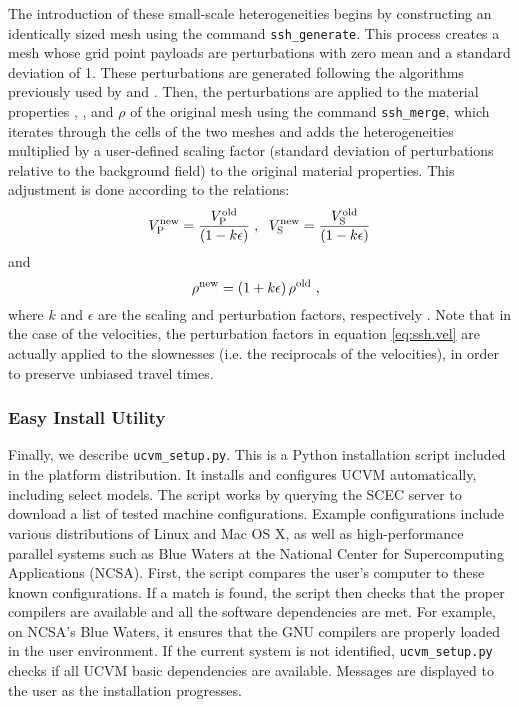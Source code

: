 The introduction of these small-scale heterogeneities begins by constructing an identically sized mesh using the command \texttt{ssh\_generate}. This process creates a mesh whose grid point payloads are perturbations with zero mean and a standard deviation of 1. These perturbations are generated following the algorithms previously used by \citet{Withers_2013_SCEC} and \citet{Savran_2014_SSA}. Then, the perturbations are applied to the material properties \vp{}, \vs{}, and $\rho$ of the original mesh using the command \texttt{ssh\_merge}, which iterates through the cells of the two meshes and adds the heterogeneities multiplied by a user-defined scaling factor (standard deviation of perturbations relative to the background field) to the original material properties. This adjustment is done according to the relations:
\begin{equation}
\label{eq:ssh.vel}
V_{\mathrm{P}}^{\mathrm{new}} = \frac{ V_{\mathrm{P}}^{\mathrm{old}} }{ (1 - k \epsilon) }
	\hspace{0.3em},
	\hspace{0.6em}
V_{\mathrm{S}}^{\mathrm{new}} = \frac{ V_{\mathrm{S}}^{\mathrm{old}} }{ (1 - k \epsilon) }
\end{equation}
%
and
%
\begin{equation}
\label{eq:ssh.density}
\rho^{\mathrm{new}} = (1 + k \epsilon) \, \rho^{\mathrm{old}}
	\hspace{0.3em},
	\hspace{0.6em}
\end{equation}
%
where $k$ and $\epsilon$ are the scaling and perturbation factors, respectively \citep[see][]{Withers_2013_SCEC, Savran_2014_SSA}. Note that in the case of the velocities, the perturbation factors in equation \eqref{eq:ssh.vel} are actually applied to the slownesses (i.e. the reciprocals of the velocities), in order to preserve unbiased travel times.

\subsubsection{Easy Install Utility}
\label{sec:easy.install}

Finally, we describe \texttt{ucvm\_setup.py}. This is a Python installation script included in the platform distribution. It installs and configures UCVM automatically, including select models. The script works by querying the SCEC server to download a list of tested machine configurations. Example configurations include various distributions of Linux and Mac OS X, as well as high-performance parallel systems such as Blue Waters at the National Center for Supercomputing Applications (NCSA). First, the script compares the user's computer to these known configurations. If a match is found, the script then checks that the proper compilers are available and all the software dependencies are met. For example, on NCSA's Blue Waters, it ensures that the GNU compilers are properly loaded in the user environment. If the current system is not identified, \texttt{ucvm\_setup.py} checks if all UCVM basic dependencies are available. Messages are displayed to the user as the installation progresses.


